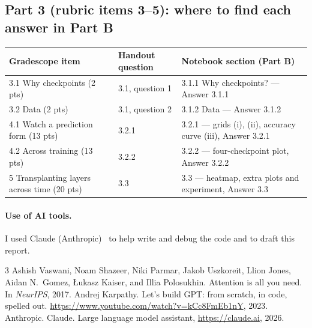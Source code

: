 \documentclass[11pt]{article}
\begin{document}
\subsection*{Part 3 (rubric items 3--5): where to find each answer in Part B}

\begin{table}[H]
\centering
\footnotesize
\begin{tabular}{@{}l l l@{}}
\toprule
Gradescope item & Handout question & Notebook section (Part B) \\
\midrule
3.1 Why checkpoints (2 pts) & 3.1, question 1 & 3.1.1 Why checkpoints? --- Answer 3.1.1 \\
3.2 Data (2 pts) & 3.1, question 2 & 3.1.2 Data --- Answer 3.1.2 \\
4.1 Watch a prediction form (13 pts) & 3.2.1 & 3.2.1 --- grids (i), (ii), accuracy curve (iii), Answer 3.2.1 \\
4.2 Across training (13 pts) & 3.2.2 & 3.2.2 --- four-checkpoint plot, Answer 3.2.2 \\
5 Transplanting layers across time (20 pts) & 3.3 & 3.3 --- heatmap, extra plots and experiment, Answer 3.3 \\
\bottomrule
\end{tabular}
\end{table}

\paragraph{Use of AI tools.} I used Claude (Anthropic)~\cite{claude} to help write and debug the code and to draft this report.

\begin{thebibliography}{3}
\setlength{\itemsep}{1pt}
\small
{} Ashish Vaswani, Noam Shazeer, Niki Parmar, Jakob Uszkoreit, Llion Jones, Aidan N.\ Gomez, {\L}ukasz Kaiser, and Illia Polosukhin. Attention is all you need. In \emph{NeurIPS}, 2017.
 Andrej Karpathy. Let's build GPT: from scratch, in code, spelled out. \url{https://www.youtube.com/watch?v=kCc8FmEb1nY}, 2023.
 Anthropic. Claude. Large language model assistant, \url{https://claude.ai}, 2026.
\end{thebibliography}
\end{document}
